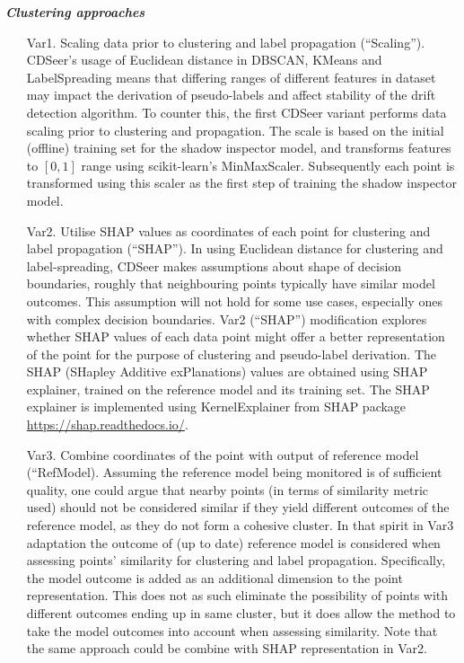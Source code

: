 \documentclass{svproc}
\begin{document}
\textbf{\textit{Clustering approaches}}
\begin{itemize}
	\item[Var1.]Scaling data prior to clustering and label propagation (“Scaling”). CDSeer’s usage of Euclidean distance in DBSCAN, KMeans and LabelSpreading means that differing ranges of different features in dataset may impact the derivation of pseudo-labels and affect stability of the drift detection algorithm. To counter this, the first CDSeer variant performs data scaling prior to clustering and propagation. The scale is based on the initial (offline) training set for the shadow inspector model, and transforms features to $[0,1]$ range using scikit-learn’s MinMaxScaler. Subsequently each point is transformed using this scaler as the first step of training the shadow inspector model.

\item[Var2.]Utilise SHAP values as coordinates of each point for clustering and label propagation (“SHAP”). In using Euclidean distance for clustering and label-spreading, CDSeer makes assumptions about shape of decision boundaries, roughly that neighbouring points typically have similar model outcomes. This assumption will not hold for some use cases, especially ones with complex decision boundaries. Var2 (“SHAP”) modification explores whether SHAP values of each data point might offer a better representation of the point for the purpose of clustering and pseudo-label derivation. The SHAP (SHapley Additive exPlanations) values are obtained using SHAP explainer, trained on the reference model and its training set. The SHAP explainer is implemented using KernelExplainer from SHAP package \url{https://shap.readthedocs.io/}.  

\item[Var3.]Combine coordinates of the point with output of reference model (“RefModel). Assuming the reference model being monitored is of sufficient quality, one could argue that nearby points (in terms of similarity metric used) should not be considered similar if they yield different outcomes of the reference model, as they do not form a cohesive cluster. In that spirit in Var3 adaptation the outcome of (up to date) reference model is considered when assessing points’ similarity for clustering and label propagation. Specifically, the model outcome is added as an additional dimension to the point representation. This does not as such eliminate the possibility of points with different outcomes ending up in same cluster, but it does allow the method to take the model outcomes into account when assessing similarity. Note that the same approach could be combine with SHAP representation in Var2.


\end{itemize}
\end{document}
